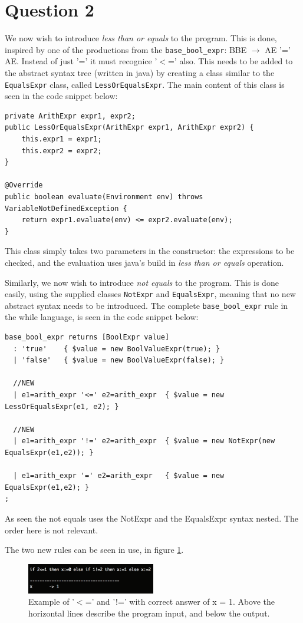 \section*{Question 2}
We now wish to introduce \textit{less than or equals} to the program. This is done, inspired by one of the productions from the \texttt{base\_bool\_expr}: BBE $\rightarrow$ AE '=' AE. Instead of just '=' it must recognice '$<$=' also. This needs to be added to the abstract syntax tree (written in java) by creating a class similar to the \texttt{EqualsExpr} class, called \texttt{LessOrEqualsExpr}. The main content of this class is seen in the code snippet below:

\begin{lstlisting}
private ArithExpr expr1, expr2;
public LessOrEqualsExpr(ArithExpr expr1, ArithExpr expr2) {
	this.expr1 = expr1;
	this.expr2 = expr2;
}

@Override
public boolean evaluate(Environment env) throws VariableNotDefinedException {
	return expr1.evaluate(env) <= expr2.evaluate(env);
}
\end{lstlisting}

This class simply takes two parameters in the constructor: the expressions to be checked, and the evaluation uses java's build in \textit{less than or equals} operation. 


Similarly, we now wish to introduce \textit{not equals} to the program. This is done easily, using the supplied classes \texttt{NotExpr} and \texttt{EqualsExpr}, meaning that no new abstract syntax needs to be introduced. The complete \texttt{base\_bool\_expr} rule in the while language, is seen in the code snippet below:

\begin{lstlisting}
base_bool_expr returns [BoolExpr value]
  : 'true'    { $value = new BoolValueExpr(true); }
  | 'false'   { $value = new BoolValueExpr(false); }

  //NEW
  | e1=arith_expr '<=' e2=arith_expr  { $value = new LessOrEqualsExpr(e1, e2); }
  
  //NEW
  | e1=arith_expr '!=' e2=arith_expr  { $value = new NotExpr(new EqualsExpr(e1,e2)); }

  | e1=arith_expr '=' e2=arith_expr   { $value = new EqualsExpr(e1,e2); }
;
\end{lstlisting}

As seen the not equals uses the NotExpr and the EqualsExpr syntax nested. The order here is not relevant.


The two new rules can be seen in use, in figure \ref{fig:Q2ex}.

\begin{figure}[H]
    \centering
    \includegraphics[width=0.5\textwidth]{fig/Q2example}
    \caption{Example of '$<$=' and '!=' with correct answer of x = 1. Above the horizontal lines describe the program input, and below the output.}
    \label{fig:Q2ex}
\end{figure}